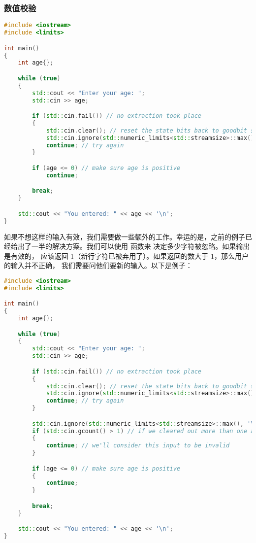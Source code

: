 \documentclass[../../LearnCpp.tex]{subfiles}
\begin{document}
\subsubsection*{数值校验}

\begin{lstlisting}[language=C++]
#include <iostream>
#include <limits>

int main()
{
    int age{};

    while (true)
    {
        std::cout << "Enter your age: ";
        std::cin >> age;

        if (std::cin.fail()) // no extraction took place
        {
            std::cin.clear(); // reset the state bits back to goodbit so we can use ignore()
            std::cin.ignore(std::numeric_limits<std::streamsize>::max(), '\n'); // clear out the bad input from the stream
            continue; // try again
        }

        if (age <= 0) // make sure age is positive
            continue;

        break;
    }

    std::cout << "You entered: " << age << '\n';
}
\end{lstlisting}

如果不想这样的输入有效，我们需要做一些额外的工作。幸运的是，之前的例子已经给出了一半的解决方案。我们可以使用  函数来
决定多少字符被忽略。如果输出是有效的， 应该返回 1（新行字符已被弃用了）。如果返回的数大于 1，那么用户的输入并不正确，
我们需要问他们要新的输入。以下是例子：


\begin{lstlisting}[language=C++]
#include <iostream>
#include <limits>

int main()
{
    int age{};

    while (true)
    {
        std::cout << "Enter your age: ";
        std::cin >> age;

        if (std::cin.fail()) // no extraction took place
        {
            std::cin.clear(); // reset the state bits back to goodbit so we can use ignore()
            std::cin.ignore(std::numeric_limits<std::streamsize>::max(), '\n'); // clear out the bad input from the stream
            continue; // try again
        }

        std::cin.ignore(std::numeric_limits<std::streamsize>::max(), '\n'); // clear out any additional input from the stream
        if (std::cin.gcount() > 1) // if we cleared out more than one additional character
        {
            continue; // we'll consider this input to be invalid
        }

        if (age <= 0) // make sure age is positive
        {
            continue;
        }

        break;
    }

    std::cout << "You entered: " << age << '\n';
}
\end{lstlisting}
\end{document}
